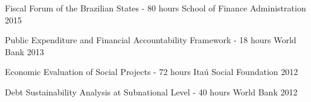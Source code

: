 \begin{cvhonors}
 
  \cvhonor
    {Fiscal Forum of the Brazilian States - 80 hours}
    {School of Finance Administration}
    {}
    {2015}

  \cvhonor
    {Public Expenditure and Financial Accountability Framework - 18 hours}
    {World Bank}
    {}
    {2013}

  \cvhonor
    {Economic Evaluation of Social Projects - 72 hours}
    {Itaú Social Foundation}
    {}
    {2012}

\cvhonor
    {Debt Sustainability Analysis at Subnational Level - 40 hours}
    {World Bank}
    {}
    {2012}

\end{cvhonors}